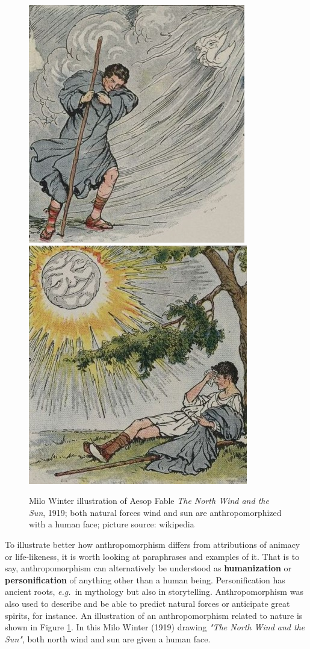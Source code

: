 \documentclass{frontiersSCNS} %
\newcommand{\eg}{{\textit{e.g.~}}}
\begin{document}
 \begin{figure}[b]\centering
  \includegraphics[scale=1]{north-wind.jpg}
  \includegraphics[scale=1]{sun.jpg}
 \caption{Milo Winter illustration of Aesop Fable \textit{The North Wind and the Sun}, 1919; both natural forces wind and sun are anthropomorphized with a human face; picture source: wikipedia}
 \label{fig:north-wind-sun}       %
 \end{figure}

To illustrate better how anthropomorphism differs from attributions of animacy or life-likeness, it is worth looking at paraphrases and examples of it. That is to say, anthropomorphism can alternatively be understood as \textbf{humanization} or \textbf{personification} of anything other than a human being. Personification has ancient roots, \eg in mythology but also in storytelling. Anthropomorphism was also used to describe and be able to predict natural forces or anticipate great spirits, for instance. An illustration of an anthropomorphism related to nature is shown in Figure \ref{fig:north-wind-sun}. In this Milo Winter (1919) drawing \textit{"The North Wind and the Sun"}, both north wind and sun are given a human face.
\end{document}
